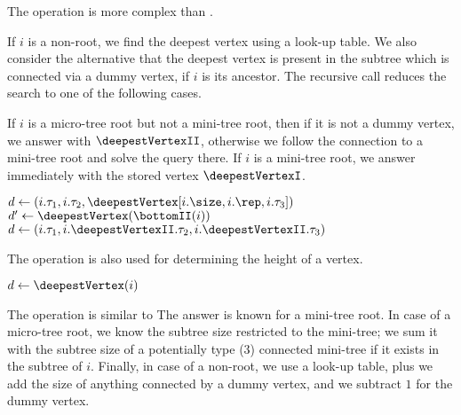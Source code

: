The operation \deepestVertex{} is more complex than \dep{}.

If $i$ is a non-root, we find the deepest vertex using a look-up table.
We also consider the alternative that the deepest vertex is present in the subtree which is connected via a dummy vertex, if $i$ is its ancestor.
The recursive call reduces the search to one of the following cases.

If $i$ is a micro-tree root but not a mini-tree root, then if it is not a dummy vertex, we answer with $\deepestVertexII$, otherwise we follow the connection to a mini-tree root and solve the query there.
If $i$ is a mini-tree root, we answer immediately with the stored vertex $\deepestVertexI$.

\begin{algorithm}
\begin{algorithmic}
		\State $d \gets (i.\tau_1, i.\tau_2, \deepestVertex[i.\size, i.\rep, i.\tau_3])$ 
		 
			\State $d' \gets \deepestVertex(\bottomII(i))$ 
				\State {}
			\Else
				\State {} 
			\EndIf
		\Else
			\State {}
		\EndIf
		\State $d \gets (i.\tau_1, i.\deepestVertexII.\tau_2, i.\deepestVertexII.\tau_3)$
		 
			\State {} 
		\Else
			\State {}
		\EndIf
	\Else
		\State {}
	\EndIf
\EndFunction
\end{algorithmic}
\end{algorithm}

The operation \deepestVertex{} is also used for determining the height of a vertex.

\begin{algorithm}
\begin{algorithmic}
	\State $d \gets \deepestVertex(i)$
	\State {}
\EndFunction
\end{algorithmic}
\end{algorithm}

The operation \subtreeSize{} is similar to \deepestVertex{}
The answer is known for a mini-tree root.
In case of a micro-tree root, we know the subtree size restricted to the mini-tree; we sum it with the subtree size of a potentially type (3) connected mini-tree if it exists in the subtree of $i$.
Finally, in case of a non-root, we use a look-up table, plus we add the size of anything connected by a dummy vertex, and we subtract $1$ for the dummy vertex.

